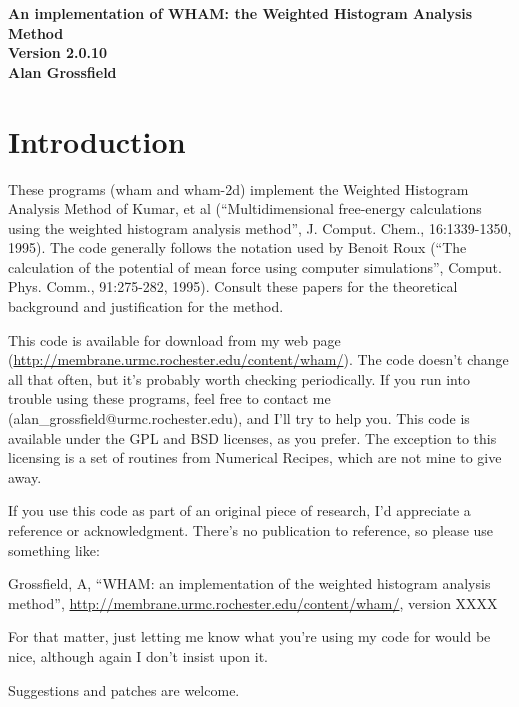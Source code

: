 \documentclass[12pt]{article}
\begin{document}
\begin{center}
\begin{LARGE}
{\bf An implementation of WHAM: the Weighted Histogram Analysis Method} \\
{\bf Version 2.0.10} \\
\vspace*{0.5in}
{\bf Alan Grossfield} \\
\end{LARGE}
\end{center}

\tableofcontents

\newpage

\section{Introduction}

These programs (wham and wham-2d) implement the Weighted Histogram
Analysis Method of Kumar, et al (``Multidimensional free-energy
calculations using the weighted histogram analysis method'',
J. Comput. Chem., 16:1339-1350, 1995).  The code generally
follows the notation used by Benoit Roux (``The calculation of the
potential of mean force using computer simulations'', Comput. Phys. Comm.,
91:275-282, 1995).  Consult these papers for the theoretical background
and justification for the method.

This code is available for download from my web page
(\url{http://membrane.urmc.rochester.edu/content/wham/}). The code doesn't
change all that often, but it's probably worth checking periodically.  If you
run into trouble using these programs, feel free to contact me
(alan\_grossfield@urmc.rochester.edu), and I'll try to help you.  This code
is available under the GPL and BSD licenses, as you prefer.  The exception to
this licensing is a set of routines from Numerical Recipes, which are not mine
to give away.

If you use this code as part of an original piece of research, I'd
appreciate a reference or acknowledgment.  There's no publication to
reference, so please use something like:

\noindent
Grossfield, A, ``WHAM: an implementation of the weighted histogram analysis
method'', \url{http://membrane.urmc.rochester.edu/content/wham/}, version
XXXX

\noindent For that matter, just letting me know what you're using my code for
would be nice, although again I don't insist upon it.

Suggestions and patches are welcome.
\end{document}
